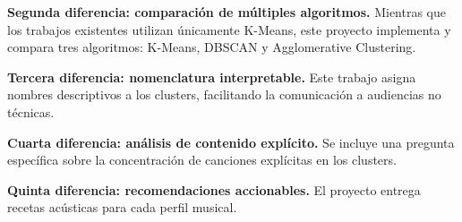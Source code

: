 \textbf{Segunda diferencia: comparación de múltiples algoritmos.} Mientras que los trabajos existentes utilizan únicamente K-Means, este proyecto implementa y compara tres algoritmos: K-Means, DBSCAN y Agglomerative Clustering.

\textbf{Tercera diferencia: nomenclatura interpretable.} Este trabajo asigna nombres descriptivos a los clusters, facilitando la comunicación a audiencias no técnicas.

\textbf{Cuarta diferencia: análisis de contenido explícito.} Se incluye una pregunta específica sobre la concentración de canciones explícitas en los clusters.

\textbf{Quinta diferencia: recomendaciones accionables.} El proyecto entrega recetas acústicas para cada perfil musical.